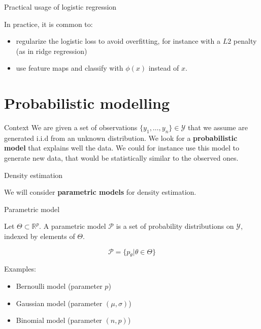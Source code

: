 \documentclass[usenames,dvipsnames]{beamer}
\begin{document}
\begin{frame}{Practical usage of logistic regression}

    In practice, it is common to:
    \begin{itemize}
	\item regularize the logistic loss to avoid overfitting, for instance with a $L2$ penalty (as in ridge regression)
	\item use feature maps and classify with $\phi(x)$ instead of $x$.
    \end{itemize}
    
\end{frame}

\section{Probabilistic modelling}%
\frame{\tableofcontents[currentsection]}
\label{sec:probabilistic_modelling}

\begin{frame}{Context}
We are given a set of observations $\{y_1, \dots, y_n\}\in \mathcal{Y} $ that we assume are generated i.i.d from an unknown distribution. We look for a \textbf{{probabilistic model}} that explains well the data. We could for instance use this model to generate new data, that would be statistically similar to the observed ones.
    
\end{frame}

\begin{frame}{Density estimation}

    We will consider \textbf{{parametric models}} for density estimation.

\begin{definition}{Parametric model}

    Let $ \Theta\subset \mathbb{R}^p$. A parametric model $ \mathcal{P} $ is a set of probability distributions on $ \mathcal{Y} $, indexed by elements of $ \Theta $.

    \begin{equation*}
	\mathcal{P}  = \{p_{\theta}|\theta \in \Theta \}
    \end{equation*}
\end{definition}

    Examples:
\begin{itemize}
    \item Bernoulli model (parameter $p$)
    \item Gaussian model (parameter $(\mu, \sigma)$)
    \item Binomial model (parameter $(n, p)$)
\end{itemize}
    
\end{frame}
\end{document}
